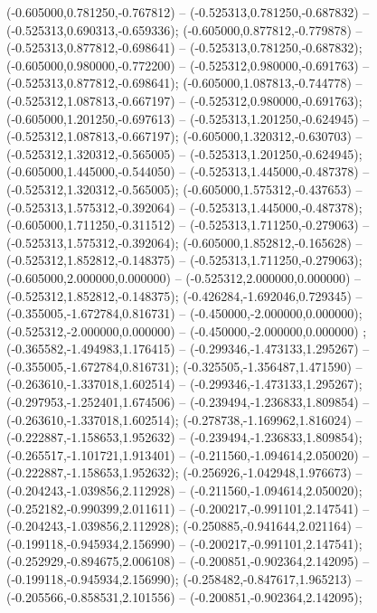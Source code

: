  (-0.605000,0.781250,-0.767812) -- (-0.525313,0.781250,-0.687832) -- (-0.525313,0.690313,-0.659336);
 (-0.605000,0.877812,-0.779878) -- (-0.525313,0.877812,-0.698641) -- (-0.525313,0.781250,-0.687832);
 (-0.605000,0.980000,-0.772200) -- (-0.525312,0.980000,-0.691763) -- (-0.525313,0.877812,-0.698641);
 (-0.605000,1.087813,-0.744778) -- (-0.525312,1.087813,-0.667197) -- (-0.525312,0.980000,-0.691763);
 (-0.605000,1.201250,-0.697613) -- (-0.525313,1.201250,-0.624945) -- (-0.525312,1.087813,-0.667197);
 (-0.605000,1.320312,-0.630703) -- (-0.525312,1.320312,-0.565005) -- (-0.525313,1.201250,-0.624945);
 (-0.605000,1.445000,-0.544050) -- (-0.525313,1.445000,-0.487378) -- (-0.525312,1.320312,-0.565005);
 (-0.605000,1.575312,-0.437653) -- (-0.525313,1.575312,-0.392064) -- (-0.525313,1.445000,-0.487378);
 (-0.605000,1.711250,-0.311512) -- (-0.525313,1.711250,-0.279063) -- (-0.525313,1.575312,-0.392064);
 (-0.605000,1.852812,-0.165628) -- (-0.525312,1.852812,-0.148375) -- (-0.525313,1.711250,-0.279063);
 (-0.605000,2.000000,0.000000) -- (-0.525312,2.000000,0.000000) -- (-0.525312,1.852812,-0.148375);
 (-0.426284,-1.692046,0.729345) -- (-0.355005,-1.672784,0.816731) -- (-0.450000,-2.000000,0.000000);
 (-0.525312,-2.000000,0.000000) -- (-0.450000,-2.000000,0.000000) ;
 (-0.365582,-1.494983,1.176415) -- (-0.299346,-1.473133,1.295267) -- (-0.355005,-1.672784,0.816731);
 (-0.325505,-1.356487,1.471590) -- (-0.263610,-1.337018,1.602514) -- (-0.299346,-1.473133,1.295267);
 (-0.297953,-1.252401,1.674506) -- (-0.239494,-1.236833,1.809854) -- (-0.263610,-1.337018,1.602514);
 (-0.278738,-1.169962,1.816024) -- (-0.222887,-1.158653,1.952632) -- (-0.239494,-1.236833,1.809854);
 (-0.265517,-1.101721,1.913401) -- (-0.211560,-1.094614,2.050020) -- (-0.222887,-1.158653,1.952632);
 (-0.256926,-1.042948,1.976673) -- (-0.204243,-1.039856,2.112928) -- (-0.211560,-1.094614,2.050020);
 (-0.252182,-0.990399,2.011611) -- (-0.200217,-0.991101,2.147541) -- (-0.204243,-1.039856,2.112928);
 (-0.250885,-0.941644,2.021164) -- (-0.199118,-0.945934,2.156990) -- (-0.200217,-0.991101,2.147541);
 (-0.252929,-0.894675,2.006108) -- (-0.200851,-0.902364,2.142095) -- (-0.199118,-0.945934,2.156990);
 (-0.258482,-0.847617,1.965213) -- (-0.205566,-0.858531,2.101556) -- (-0.200851,-0.902364,2.142095);
